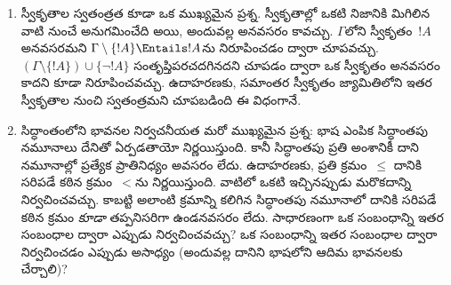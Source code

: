 \documentclass[../../../include/open-logic-section]{subfiles}
\begin{document}
\begin{explain}
\begin{enumerate}
  ప్రయత్నించినట్టవుతుంది. $\Gamma$కు ఒక నమూనాను కనుగొంటే, స్వీకృతాల మధ్య
  అలాంటి వైరుధ్యం లేదని నిర్ధారించవచ్చు. మన సిద్ధాంతానికి నమూనాలు ఉంటే, వాటిని
  పరిశోధించడానికీ నమూనాలను నిర్మించడానికీ తార్కిక పద్ధతులను ఉపయోగించవచ్చు.
\item స్వీకృతాల స్వతంత్రత కూడా ఒక ముఖ్యమైన ప్రశ్న. స్వీకృతాల్లో ఒకటి
  నిజానికి మిగిలిన వాటి నుంచే అనుగమించేది అయి, అందువల్ల అనవసరం కావచ్చు.
  $\Gamma$లోని స్వీకృతం~$!A$ అనవసరమని
  $\Gamma \setminus \{!A\} \Entails !A$ను నిరూపించడం ద్వారా
  చూపవచ్చు. $(\Gamma \setminus \{!A\}) \cup \{\lnot !A\}$
  సంతృప్తిపరచదగినదని చూపడం ద్వారా ఒక స్వీకృతం అనవసరం కాదని కూడా
  నిరూపించవచ్చు. ఉదాహరణకు, సమాంతర స్వీకృతం జ్యామితిలోని ఇతర
  స్వీకృతాల నుంచి స్వతంత్రమని చూపబడింది ఈ విధంగానే.
\item సిద్ధాంతంలోని భావనల నిర్వచనీయత మరో ముఖ్యమైన ప్రశ్న: భాష ఎంపిక
  సిద్ధాంతపు నమూనాలు దేనితో ఏర్పడతాయో నిర్ణయిస్తుంది. కానీ సిద్ధాంతపు
  ప్రతి అంశానికీ దాని నమూనాల్లో ప్రత్యేక ప్రాతినిధ్యం అవసరం లేదు.
  ఉదాహరణకు, ప్రతి క్రమం~$\le$ దానికి సరిపడే కఠిన క్రమం~$<$ను
  నిర్ణయిస్తుంది. వాటిలో ఒకటి ఇచ్చినప్పుడు మరొకదాన్ని నిర్వచించవచ్చు.
  కాబట్టి అలాంటి క్రమాన్ని కలిగిన సిద్ధాంతపు నమూనాలో దానికి సరిపడే కఠిన
  క్రమం \emph{కూడా} తప్పనిసరిగా ఉండనవసరం లేదు. సాధారణంగా ఒక సంబంధాన్ని
  ఇతర సంబంధాల ద్వారా ఎప్పుడు నిర్వచించవచ్చు? ఒక సంబంధాన్ని ఇతర
  సంబంధాల ద్వారా నిర్వచించడం ఎప్పుడు అసాధ్యం (అందువల్ల దానిని భాషలోని
  ఆదిమ భావనలకు చేర్చాలి)?
\end{enumerate}
\end{explain}
\end{document}
